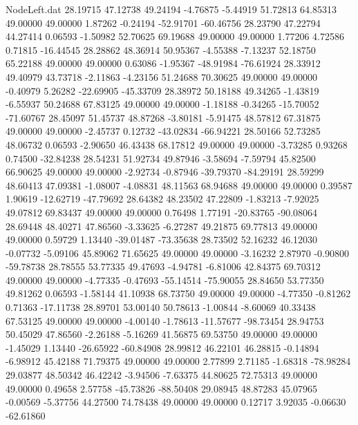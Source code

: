 \begin{filecontents}{NodeLeft.dat}
  28.19715   47.12738   49.24194    -4.76875   -5.44919   51.72813   64.85313   49.00000   49.00000    1.87262   -0.24194  -52.91701  -60.46756
  28.23790   47.22794   44.27414     0.06593   -1.50982   52.70625   69.19688   49.00000   49.00000    1.77206    4.72586    0.71815  -16.44545
  28.28862   48.36914   50.95367    -4.55388   -7.13237   52.18750   65.22188   49.00000   49.00000    0.63086   -1.95367  -48.91984  -76.61924
  28.33912   49.40979   43.73718    -2.11863   -4.23156   51.24688   70.30625   49.00000   49.00000   -0.40979    5.26282  -22.69905  -45.33709
  28.38972   50.18188   49.34265    -1.43819   -6.55937   50.24688   67.83125   49.00000   49.00000   -1.18188   -0.34265  -15.70052  -71.60767
  28.45097   51.45737   48.87268    -3.80181   -5.91475   48.57812   67.31875   49.00000   49.00000   -2.45737    0.12732  -43.02834  -66.94221
  28.50166   52.73285   48.06732     0.06593   -2.90650   46.43438   68.17812   49.00000   49.00000   -3.73285    0.93268    0.74500  -32.84238
  28.54231   51.92734   49.87946    -3.58694   -7.59794   45.82500   66.90625   49.00000   49.00000   -2.92734   -0.87946  -39.79370  -84.29191
  28.59299   48.60413   47.09381    -1.08007   -4.08831   48.11563   68.94688   49.00000   49.00000    0.39587    1.90619  -12.62719  -47.79692
  28.64382   48.23502   47.22809    -1.83213   -7.92025   49.07812   69.83437   49.00000   49.00000    0.76498    1.77191  -20.83765  -90.08064
  28.69448   48.40271   47.86560    -3.33625   -6.27287   49.21875   69.77813   49.00000   49.00000    0.59729    1.13440  -39.01487  -73.35638
  28.73502   52.16232   46.12030    -0.07732   -5.09106   45.89062   71.65625   49.00000   49.00000   -3.16232    2.87970   -0.90800  -59.78738
  28.78555   53.77335   49.47693    -4.94781   -6.81006   42.84375   69.70312   49.00000   49.00000   -4.77335   -0.47693  -55.14514  -75.90055
  28.84650   53.77350   49.81262     0.06593   -1.58144   41.10938   68.73750   49.00000   49.00000   -4.77350   -0.81262    0.71363  -17.11738
  28.89701   53.00140   50.78613    -1.00844   -8.60069   40.33438   67.53125   49.00000   49.00000   -4.00140   -1.78613  -11.57677  -98.73454
  28.94753   50.45029   47.86560    -2.26188   -5.16269   41.56875   69.53750   49.00000   49.00000   -1.45029    1.13440  -26.65922  -60.84908
  28.99812   46.22101   46.28815    -0.14894   -6.98912   45.42188   71.79375   49.00000   49.00000    2.77899    2.71185   -1.68318  -78.98284
  29.03877   48.50342   46.42242    -3.94506   -7.63375   44.80625   72.75313   49.00000   49.00000    0.49658    2.57758  -45.73826  -88.50408
  29.08945   48.87283   45.07965    -0.00569   -5.37756   44.27500   74.78438   49.00000   49.00000    0.12717    3.92035   -0.06630  -62.61860

\end{filecontents}
